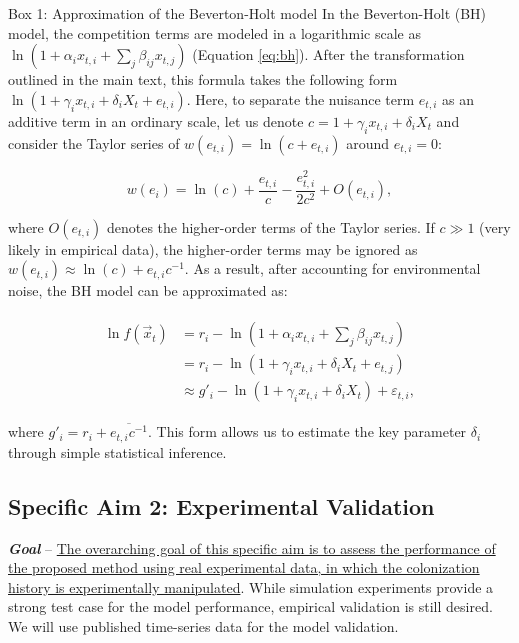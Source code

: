 \documentclass[12pt, class=article, crop=false]{standalone}
\begin{document}
\begin{tcolorbox}[{
  breakable,
  colback=white,
  colframe=gray,
  coltext=black,
  parbox=false,
  boxsep=5pt,
  arc=1pt}]
    Box 1: Approximation of the Beverton-Holt model
    \hline
    In the Beverton-Holt (BH) model, the competition terms are modeled in a logarithmic scale as $\ln(1 + \alpha_i x_{t,i} + \sum_j \beta_{ij} x_{t,j})$ (Equation \ref{eq:bh}).
    After the transformation outlined in the main text, this formula takes the following form $\ln(1 + \gamma_i x_{t,i} + \delta_i X_t + e_{t,i})$.
    Here, to separate the nuisance term $e_{t,i}$ as an additive term in an ordinary scale, let us denote $c = 1 + \gamma_i x_{t,i} + \delta_i X_t$ and consider the Taylor series of $w(e_{t,i}) = \ln(c + e_{t,i})$ around $e_{t,i} = 0$:

    \begin{equation}
        \label{eq:bhtaylor}
        w(e_i) = \ln(c) + \frac{e_{t,i}}{c} - \frac{e_{t,i}^2}{2 c^2} + O(e_{t,i}),
    \end{equation}

    where $O(e_{t,i})$ denotes the higher-order terms of the Taylor series. If $c \gg 1$ (very likely in empirical data), the higher-order terms may be ignored as $w(e_{t,i}) \approx \ln(c) + e_{t,i} c^{-1}$.
    As a result, after accounting for environmental noise, the BH model can be approximated as:

    \begin{align}
    \begin{split}
        \ln f(\overset{\rightarrow}{x}_{t}) 
            &= r_i - \ln(1 + \alpha_i x_{t,i} + \sum_j \beta_{ij} x_{t,j})\\
            &= r_i - \ln(1 + \gamma_i x_{t,i} + \delta_{i} X_t + e_{t,j})\\
            &\approx g'_{i} - \ln(1 + \gamma_i x_{t,i} + \delta_i X_t) + \varepsilon_{t,i},
    \end{split}
    \end{align}

    where $g'_{i} = r_i + \overline{e_{t,i} c^{-1}}$. This form allows us to estimate the key parameter $\delta_i$ through simple statistical inference.
\end{tcolorbox}

\subsection*{Specific Aim 2: Experimental Validation}

\textbf{\textit{Goal}} -- 
\ul{The overarching goal of this specific aim is to assess the performance of the proposed method using real experimental data, in which the colonization history is experimentally manipulated}.
While simulation experiments provide a strong test case for the model performance, empirical validation is still desired.
We will use published time-series data for the model validation.
\end{document}
